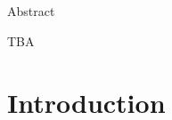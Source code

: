 \documentclass[11pt,oneside]{book}
\begin{document}
\chapter*{}

\begin{center}

\huge{Abstract}
\end{center}


TBA

\tableofcontents

\listoffigures
{}
\listoftables
{}

\chapter{Introduction}
\thispagestyle{empty}
\end{document}
